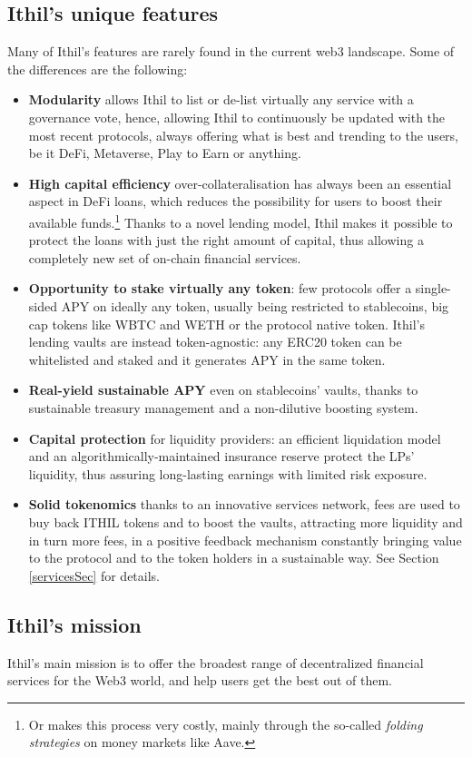 \documentclass[a4paper,10 pt]{article}
\theoremstyle{definition}
\begin{document}
\subsection{Ithil's unique features}
Many of Ithil's features are rarely found in the current web3 landscape. Some of the differences are the following:
\begin{itemize}
\item {\bf Modularity} allows Ithil to list or de-list virtually any service with a governance vote, hence, allowing Ithil to continuously be updated with the most recent protocols, always offering what is best and trending to the users, be it DeFi, Metaverse, Play to Earn or anything.
\item {\bf High capital efficiency} over-collateralisation has always been an essential aspect in DeFi loans, which reduces the possibility for users to boost their available funds.\footnote{Or makes this process very costly, mainly through the so-called {\it folding strategies} on money markets like Aave.} Thanks to a novel lending model, Ithil makes it possible to protect the loans with just the right amount of capital, thus allowing a completely new set of on-chain financial services.
\item {\bf Opportunity to stake virtually any token}: few protocols offer a single-sided APY on ideally any token, usually being restricted to stablecoins, big cap tokens like WBTC and WETH or the protocol native token. Ithil's lending vaults are instead token-agnostic: any ERC20 token can be whitelisted and staked and it generates APY in the same token.
\item {\bf Real-yield sustainable APY} even on stablecoins' vaults, thanks to sustainable treasury management and a non-dilutive boosting system.
\item {\bf Capital protection} for liquidity providers: an efficient liquidation model and an algorithmically-maintained insurance reserve protect the LPs' liquidity, thus assuring long-lasting earnings with limited risk exposure.
\item {\bf Solid tokenomics} thanks to an innovative services network, fees are used to buy back ITHIL tokens and to boost the vaults, attracting more liquidity and in turn more fees, in a positive feedback mechanism constantly bringing value to the protocol and to the token holders in a sustainable way. See Section \ref{servicesSec} for details. 
\end{itemize}

\subsection{Ithil's mission}
Ithil's main mission is to offer the broadest range of decentralized financial services for the Web3 world, and help users get the best out of them.
\end{document}
